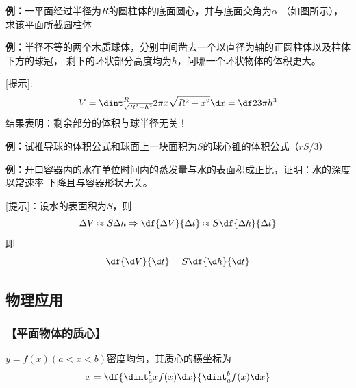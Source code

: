 {\bf 例：}一平面经过半径为$R$的圆柱体的底面圆心，并与底面交角为$\alpha$
（如图所示），求该平面所截圆柱体

\begin{center}
\end{center}

{\bf 例：}半径不等的两个木质球体，分别中间凿去一个以直径为轴的正圆柱体以及柱体下方的球冠，
剩下的环状部分高度均为$h$，问哪一个环状物体的体积更大。

[提示]:
$$V=\dint_{\sqrt{R^2-h^2}}^R2\pi x\sqrt{R^2-x^2}\d x=\df23\pi h^3$$
结果表明：剩余部分的体积与球半径无关！

{\bf 例：}试推导球的体积公式和球面上一块面积为$S$的球心锥的体积公式（$rS/3$）

{\bf 例：}开口容器内的水在单位时间内的蒸发量与水的表面积成正比，证明：水的深度以常速率
下降且与容器形状无关。

[提示]：设水的表面积为$S$，则
$$\Delta V\approx S\Delta h\Rightarrow
\df{\Delta V}{\Delta t}\approx S\df{\Delta h}{\Delta t}$$
即
$$\df{\d V}{\d t}=S\df{\d h}{\d t}$$

\subsection{物理应用}

\subsubsection{【平面物体的质心】}
$y=f(x)(a<x<b)$密度均匀，其质心的横坐标为
$$\bar{x}=\df{\dint_a^bxf(x)\d x}{\dint_a^bf(x)\d x}$$

